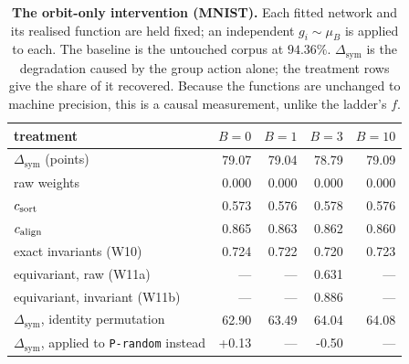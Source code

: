 \begin{table}[t]
\centering\small
\caption{\textbf{The orbit-only intervention (MNIST).} Each fitted network and its realised function are held fixed; an independent $g_i\sim\mu_B$ is applied to each. The baseline is the untouched corpus at $94.36\%$. $\Delta_{\mathrm{sym}}$ is the degradation caused by the group action alone; the treatment rows give the share of it recovered. Because the functions are unchanged to machine precision, this is a causal measurement, unlike the ladder's $f$.}
\label{tab:orbit}
\begin{tabular}{@{}lrrrr@{}}
\toprule
treatment & $B=0$ & $B=1$ & $B=3$ & $B=10$ \\
\midrule
$\Delta_{\mathrm{sym}}$ (points) & 79.07 & 79.04 & 78.79 & 79.09 \\
\midrule
raw weights & 0.000 & 0.000 & 0.000 & 0.000 \\
$c_{\mathrm{sort}}$ & 0.573 & 0.576 & 0.578 & 0.576 \\
$c_{\mathrm{align}}$ & 0.865 & 0.863 & 0.862 & 0.860 \\
exact invariants (W10) & 0.724 & 0.722 & 0.720 & 0.723 \\
equivariant, raw (W11a) & --- & --- & 0.631 & --- \\
equivariant, invariant (W11b) & --- & --- & 0.886 & --- \\
\midrule
$\Delta_{\mathrm{sym}}$, identity permutation & 62.90 & 63.49 & 64.04 & 64.08 \\
$\Delta_{\mathrm{sym}}$, applied to \texttt{P-random} instead & +0.13 & --- & -0.50 & --- \\
\bottomrule
\end{tabular}
\end{table}
